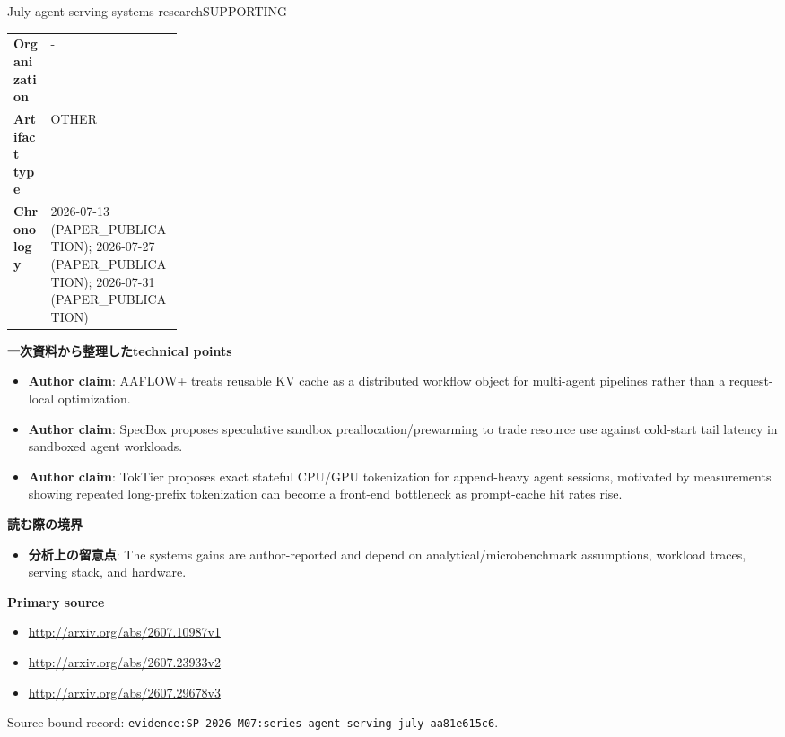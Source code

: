 \begin{technicalnote}{July agent-serving systems research}{SUPPORTING}
\begin{tabularx}{\linewidth}{@{}>{\bfseries}p{0.22\linewidth}X@{}}
Organization & - \\
Artifact type & OTHER \\
Chronology & 2026-07-13 (PAPER\_PUBLICATION); 2026-07-27 (PAPER\_PUBLICATION); 2026-07-31 (PAPER\_PUBLICATION) \\
\end{tabularx}
\smallskip
{\bfseries 一次資料から整理したtechnical points}
\begin{itemize}[leftmargin=1.5em,itemsep=0.35em]
\item \textbf{Author claim}: AAFLOW+ treats reusable KV cache as a distributed workflow object for multi-agent pipelines rather than a request-local optimization.
\item \textbf{Author claim}: SpecBox proposes speculative sandbox preallocation/prewarming to trade resource use against cold-start tail latency in sandboxed agent workloads.
\item \textbf{Author claim}: TokTier proposes exact stateful CPU/GPU tokenization for append-heavy agent sessions, motivated by measurements showing repeated long-prefix tokenization can become a front-end bottleneck as prompt-cache hit rates rise.
\end{itemize}
{\bfseries 読む際の境界}
\begin{itemize}[leftmargin=1.5em,itemsep=0.35em]
\item \textbf{分析上の留意点}: The systems gains are author-reported and depend on analytical/microbenchmark assumptions, workload traces, serving stack, and hardware.
\end{itemize}
{\bfseries Primary source}
\begingroup\sloppy
\begin{itemize}[leftmargin=1.5em,itemsep=0.25em]
\item {\scriptsize\url{http://arxiv.org/abs/2607.10987v1}}
\item {\scriptsize\url{http://arxiv.org/abs/2607.23933v2}}
\item {\scriptsize\url{http://arxiv.org/abs/2607.29678v3}}
\end{itemize}
\endgroup
{\scriptsize\color{SurveyMuted}Source-bound record: \texttt{evidence:SP-2026-M07:series-agent-serving-july-aa81e615c6}.}
\end{technicalnote}
\medskip
